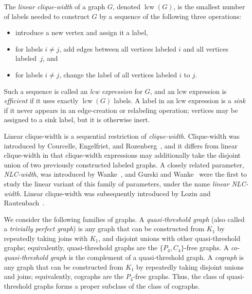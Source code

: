 \documentclass[10pt]{article}
\newcommand{\lcw}{\operatorname{lcw}}
\theoremstyle{plain}
\begin{document}
The \emph{linear clique-width} of a graph $G$, denoted $\lcw(G)$, is the smallest number of labels needed to construct $G$ by a sequence of the following three operations:
\begin{itemize}[noitemsep, topsep=0pt]
\item introduce a new vertex and assign it a label,
\item for labels $i \neq j$, add edges between all vertices labeled $i$ and all vertices labeled~$j$, and
\item for labels $i \neq j$, change the label of all vertices labeled $i$ to $j$.
\end{itemize}
Such a sequence is called an \emph{lcw expression} for $G$, and an lcw expression is \emph{efficient} if it uses exactly $\lcw(G)$ labels. A label in an lcw expression is a \emph{sink} if it never appears in an edge-creation or relabeling operation; vertices may be assigned to a sink label, but it is otherwise inert.

Linear clique-width is a sequential restriction of \emph{clique-width}. Clique-width was introduced by Courcelle, Engelfriet, and Rozenberg~\cite{courcelle:handle-rewritin:}, and it differs from linear clique-width in that clique-width expressions may additionally take the disjoint union of two previously constructed labeled graphs. A closely related parameter, \emph{NLC-width}, was introduced by Wanke~\cite{wanke:k-nlc-graphs-an:}, and Gurski and Wanke~\cite{gurski:on-the-relation:} were the first to study the linear variant of this family of parameters, under the name \emph{linear NLC-width}. Linear clique-width was subsequently introduced by Lozin and Rautenbach~\cite{lozin:the-relative-cl:}.

We consider the following families of graphs. A \emph{quasi-threshold graph} (also called a \emph{trivially perfect graph}) is any graph that can be constructed from $K_1$ by repeatedly taking joins with $K_1$, and disjoint unions with other quasi-threshold graphs; equivalently, quasi-threshold graphs are the $\{P_4,C_4\}$-free graphs. A \emph{co-quasi-threshold graph} is the complement of a quasi-threshold graph. A \emph{cograph} is any graph that can be constructed from $K_1$ by repeatedly taking disjoint unions and joins; equivalently, cographs are the $P_4$-free graphs. Thus, the class of quasi-threshold graphs forms a proper subclass of the class of cographs.
\end{document}
